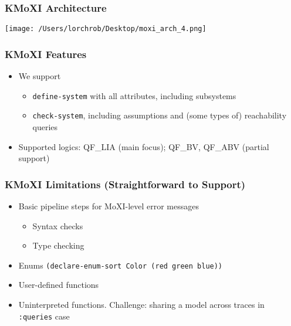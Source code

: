 \documentclass[11pt,xcolor={dvipsnames},hyperref={pdftex,pdfpagemode=UseNone,hidelinks,pdfdisplaydoctitle=true},usepdftitle=false]{beamer}
\newcommand{\code}[1]{{\footnotesize\texttt{#1}}}
\begin{document}
\begin{frame} 
    \frametitle{KMoXI Architecture}
    \texttt{[image: /Users/lorchrob/Desktop/moxi\_arch\_4.png]}
\end{frame}


\begin{frame}
    \frametitle{KMoXI Features}
    \begin{itemize}
        \item We support
        \begin{itemize}
            \item \code{define-system} with all attributes, including subsystems
            \item \code{check-system}, including assumptions and (some types of) reachability queries
        \end{itemize}
        \item Supported logics: QF\_LIA (main focus); QF\_BV, QF\_ABV (partial support)
    \end{itemize}
\end{frame} 

\begin{frame}
    \frametitle{KMoXI Limitations (Straightforward to Support)}
    \pause
    \begin{itemize}
        \item Basic pipeline steps for MoXI-level error messages
        \begin{itemize}
            \item Syntax checks 
            \item Type checking
        \end{itemize} 
        \pause
        \item Enums \newline 
        {\footnotesize \texttt{(declare-enum-sort Color (red green blue))}}
        \pause
        \item User-defined functions
        \item Uninterpreted functions. Challenge: sharing a model across traces in \code{:queries} case
    \end{itemize}
\end{frame}
\end{document}
